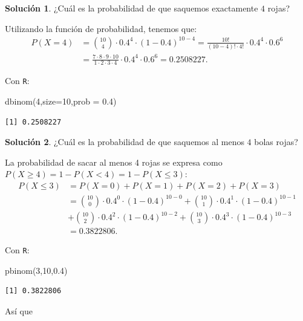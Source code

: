 \documentclass[
  letterpaper,
  DIV=11,
  numbers=noendperiod]{scrreprt}
\newenvironment{Shaded}{\begin{snugshade}}{\end{snugshade}}
\newcommand{\AttributeTok}[1]{\textcolor[rgb]{0.40,0.45,0.13}{#1}}
\newcommand{\DecValTok}[1]{\textcolor[rgb]{0.68,0.00,0.00}{#1}}
\newcommand{\FloatTok}[1]{\textcolor[rgb]{0.68,0.00,0.00}{#1}}
\newcommand{\FunctionTok}[1]{\textcolor[rgb]{0.28,0.35,0.67}{#1}}
\newcommand{\NormalTok}[1]{\textcolor[rgb]{0.00,0.23,0.31}{#1}}
\begin{document}
\textbf{Solución 1}. ¿Cuál es la probabilidad de que saquemos
exactamente \(4\) rojas?

Utilizando la función de probabilidad, tenemos que: \[
\begin{array}{ll}
P(X=4)&={10\choose 4}\cdot 0.4^4\cdot (1-0.4)^{10-4}
= \frac{10!}{(10-4)!\cdot 4!}\cdot 0.4^4\cdot 0.6^6\\
&= \frac{7\cdot 8\cdot 9\cdot 10}{1\cdot 2\cdot 3\cdot 4}\cdot 0.4^4\cdot 0.6^6=0.2508227.
\end{array}
\]

Con \texttt{R}:

\begin{Shaded}
\begin{Highlighting}[]
\FunctionTok{dbinom}\NormalTok{(}\DecValTok{4}\NormalTok{,}\AttributeTok{size=}\DecValTok{10}\NormalTok{,}\AttributeTok{prob =} \FloatTok{0.4}\NormalTok{)}
\end{Highlighting}
\end{Shaded}

\begin{verbatim}
[1] 0.2508227
\end{verbatim}

\textbf{Solución 2}. ¿Cuál es la probabilidad de que saquemos al menos
\(4\) bolas rojas?

La probabilidad de sacar al menos 4 rojas se expresa como
\(P(X \geq 4)=1-P(X<4)=1-P(X\leq 3):\) \[
\begin{array}{rl}
P(X\leq 3)& = P(X=0)+P(X=1)+P(X=2)+P(X=3)\\
&= 
 {10\choose 0}\cdot 0.4^0\cdot (1-0.4)^{10-0}+ {10\choose 1}\cdot 0.4^1\cdot (1-0.4)^{10-1}\\
&+{10\choose 2}\cdot 0.4^2\cdot (1-0.4)^{10-2}+ {10\choose 3}\cdot 0.4^3\cdot (1-0.4)^{10-3}\\
&=0.3822806.
\end{array}
\]

Con \texttt{R}:

\begin{Shaded}
\begin{Highlighting}[]
\FunctionTok{pbinom}\NormalTok{(}\DecValTok{3}\NormalTok{,}\DecValTok{10}\NormalTok{,}\FloatTok{0.4}\NormalTok{)}
\end{Highlighting}
\end{Shaded}

\begin{verbatim}
[1] 0.3822806
\end{verbatim}

Así que
\end{document}
